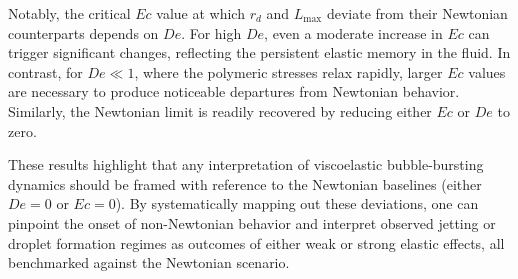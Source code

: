 \documentclass{jfm}
\newcommand{\bb}{\color{black} \normalfont}
\begin{document}
Notably, the critical $Ec$ value at which $r_d$ and $L_{\text{max}}$ deviate from their Newtonian counterparts depends on $De$. For high $De$, even a moderate increase in $Ec$ can trigger significant changes, reflecting the persistent elastic memory in the fluid. In contrast, for $De \ll 1$, where the polymeric stresses relax rapidly, larger $Ec$ values are necessary to produce noticeable departures from Newtonian behavior. Similarly, the Newtonian limit is readily recovered by reducing either $Ec$ or $De$ to zero.

These results highlight that any interpretation of viscoelastic bubble-bursting dynamics should be framed with reference to the Newtonian baselines (either $De = 0$ or $Ec = 0$). By systematically mapping out these deviations, one can pinpoint the onset of non-Newtonian behavior and interpret observed jetting or droplet formation regimes as outcomes of either weak or strong elastic effects, all benchmarked against the Newtonian scenario.

\bb



\end{document}
